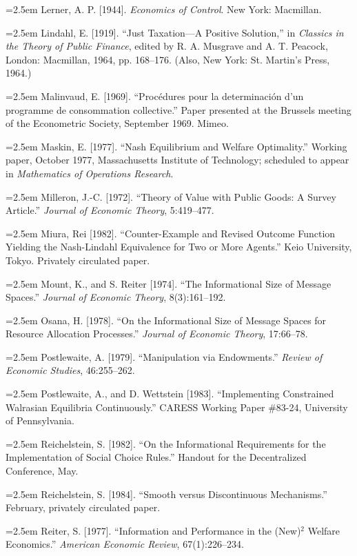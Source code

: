 \documentclass[12pt, letterpaper]{article}
\newcommand{\bibentry}[1]{\noindent\hangindent=2.5em\hangafter=1 \small #1 \par\vspace{0.75em}}
\begin{document}
\bibentry{Lerner, A. P. [1944]. \textit{Economics of Control}. New York: Macmillan.}

\bibentry{Lindahl, E. [1919]. ``Just Taxation---A Positive Solution,'' in \textit{Classics in the Theory of Public Finance}, edited by R. A. Musgrave and A. T. Peacock, London: Macmillan, 1964, pp. 168--176. (Also, New York: St. Martin's Press, 1964.)}

\bibentry{Malinvaud, E. [1969]. ``Procédures pour la determinación d'un programme de consommation collective.'' Paper presented at the Brussels meeting of the Econometric Society, September 1969. Mimeo.}

\bibentry{Maskin, E. [1977]. ``Nash Equilibrium and Welfare Optimality.'' Working paper, October 1977, Massachusetts Institute of Technology; scheduled to appear in \textit{Mathematics of Operations Research}.}

\bibentry{Milleron, J.-C. [1972]. ``Theory of Value with Public Goods: A Survey Article.'' \textit{Journal of Economic Theory}, 5:419--477.}

\bibentry{Miura, Rei [1982]. ``Counter-Example and Revised Outcome Function Yielding the Nash-Lindahl Equivalence for Two or More Agents.'' Keio University, Tokyo. Privately circulated paper.}

\bibentry{Mount, K., and S. Reiter [1974]. ``The Informational Size of Message Spaces.'' \textit{Journal of Economic Theory}, 8(3):161--192.}

\bibentry{Osana, H. [1978]. ``On the Informational Size of Message Spaces for Resource Allocation Processes.'' \textit{Journal of Economic Theory}, 17:66--78.}

\bibentry{Postlewaite, A. [1979]. ``Manipulation via Endowments.'' \textit{Review of Economic Studies}, 46:255--262.}

\bibentry{Postlewaite, A., and D. Wettstein [1983]. ``Implementing Constrained Walrasian Equilibria Continuously.'' CARESS Working Paper \#83-24, University of Pennsylvania.}

\bibentry{Reichelstein, S. [1982]. ``On the Informational Requirements for the Implementation of Social Choice Rules.'' Handout for the Decentralized Conference, May.}

\bibentry{Reichelstein, S. [1984]. ``Smooth versus Discontinuous Mechanisms.'' February, privately circulated paper.}

\bibentry{Reiter, S. [1977]. ``Information and Performance in the (New)$^2$ Welfare Economics.'' \textit{American Economic Review}, 67(1):226--234.}
\end{document}
